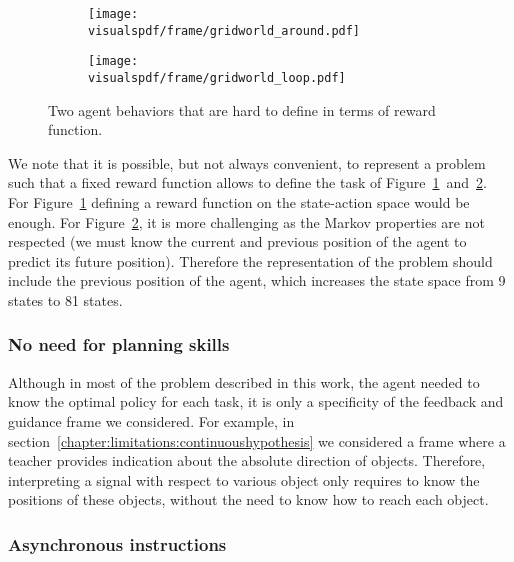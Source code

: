 \begin{figure}[!htbp]
\centering
    \begin{subfigure}[b]{0.49\columnwidth}
        \centering
        \texttt{[image: \\visualspdf/frame/gridworld\_around.pdf]}
        \caption{}
        \label{fig:gridwolrdgenericframesaround}
    \end{subfigure}
    \begin{subfigure}[b]{0.49\columnwidth}
        \centering
        \texttt{[image: \\visualspdf/frame/gridworld\_loop.pdf]}
        \caption{}
        \label{fig:gridwolrdgenericframesloop}
    \end{subfigure}
\caption{Two agent behaviors that are hard to define in terms of reward function.}
\label{fig:gridwolrdgenericframes}
\end{figure}

We note that it is possible, but not always convenient, to represent a problem such that a fixed reward function allows to define the task of Figure~\ref{fig:gridwolrdgenericframesaround}~and~\ref{fig:gridwolrdgenericframesloop}. For Figure~\ref{fig:gridwolrdgenericframesaround} defining a reward function on the state-action space would be enough. For Figure~\ref{fig:gridwolrdgenericframesloop}, it is more challenging as the Markov properties are not respected (we must know the current and previous position of the agent to predict its future position). Therefore the representation of the problem should include the previous position of the agent, which increases the state space from 9 states to 81 states.

\subsubsection*{No need for planning skills}

Although in most of the problem described in this work, the agent needed to know the optimal policy for each task, it is only a specificity of the feedback and guidance frame we considered. For example, in section~\ref{chapter:limitations:continuoushypothesis} we considered a frame where a teacher provides indication about the absolute direction of objects. Therefore, interpreting a signal with respect to various object only requires to know the positions of these objects, without the need to know how to reach each object.


\subsubsection*{Asynchronous instructions}

